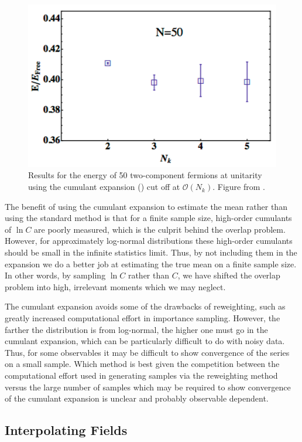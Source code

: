 \begin{figure}
\begin{center}
\includegraphics[width=0.5\linewidth]{Chapter5-figures/cumulant}
\end{center}
\caption{\label{fig:cumulant} Results for the energy of 50 two-component fermions at unitarity using the cumulant expansion () cut off at ${\mathcal{ O}}(N_k)$. Figure from \cite{EKLN4}.}
\end{figure}

The benefit of using the cumulant expansion to estimate the mean rather than using the standard method is that for a finite sample size, high-order cumulants of $\ln C$ are poorly measured, which is the culprit behind the overlap problem. However, for approximately log-normal distributions these high-order cumulants should be small in the infinite statistics limit. Thus, by not including them in the expansion we do a better job at estimating the true mean on a finite sample size. In other words, by sampling $\ln C$ rather than $C$, we have shifted the overlap problem into high, irrelevant moments which we may neglect.

The cumulant expansion avoids some of the drawbacks of reweighting, such as greatly increased computational effort in importance sampling. However, the farther the distribution is from log-normal, the higher one must go in the cumulant expansion, which can be particularly difficult to do with noisy data. Thus, for some observables it may be difficult to show convergence of the series on a small sample. Which method is best given the competition between the computational effort used in generating samples via the reweighting method versus the large number of samples which may be required to show convergence of the cumulant expansion is unclear and probably observable dependent. 

\subsection{\label{sec:interp}Interpolating Fields}

